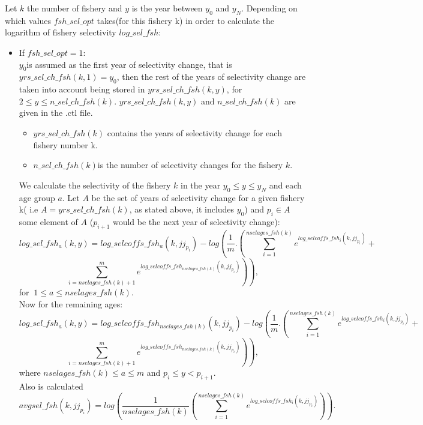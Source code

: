 \documentclass{article}
\begin{document}
Let $k$ the number of fishery and $y$ is the year between $y_0$ and $y_N$.
Depending on which values $fsh\_sel\_opt$ takes(for this fishery k) in order to calculate the logarithm of fishery selectivity $log\_sel\_fsh$:
\begin{itemize}
\item If $fsh\_sel\_opt=1:$\\

$y_0$is assumed as the first year of selectivity change, that is $yrs\_sel\_ch\_fsh(k,1)=y_0$, then the rest of the years of selectivity change are taken into account being stored in $yrs\_sel\_ch\_fsh(k,y)$, for $2\leq y \leq n\_sel\_ch\_fsh(k)$. $yrs\_sel\_ch\_fsh(k,y)$ and $n\_sel\_ch\_fsh(k)$  are given in the .ctl file.
\begin{itemize}
    \item $yrs\_sel\_ch\_fsh(k)$ contains the years of selectivity change for each fishery number k.
    \item $n\_sel\_ch\_fsh(k)$is the number of selectivity changes for the fishery $k$.
    
\end{itemize}


We calculate the selectivity of the fishery $k$ in the year $y_0\leq y \leq y_N$ and each age group $a$. Let $A$ be the set of years of selectivity change for a given fishery k( i.e $A= yrs\_sel\_ch\_fsh(k)$, as stated above, it includes $y_0$) and $p_i\in A$  some element of $A$ ($p_{i+1}$ would be the next year of selectivity change):
 \begin{equation}
        log\_sel\_fsh_a(k,y)=log\_selcoffs\_fsh_a(k,jj_{p_i})-log\left(\dfrac{1}{m}.\left(\sum_{i=1}^{nselages\_fsh(k)}e^{log\_selcoffs\_fsh_i(k,jj_{p_i})}+\right.\right.
    \end{equation}
    \begin{equation*}
       \left. \left.\sum_{i=nselages\_fsh(k)+1}^{m}e^{log\_selcoffs\_fsh_{nselages\_fsh(k)}(k,jj_{p_i})}\right)\right), 
    \end{equation*}
   for $\ 1\leq a \leq nselages\_fsh(k)$.\\
   
  Now for the remaining ages:
    \begin{equation}
         log\_sel\_fsh_a(k,y)=log\_selcoffs\_fsh_{nselages\_fsh(k)}(k,jj_{p_i})-log\left(\dfrac{1}{m}.\left(\sum_{i=1}^{nselages\_fsh(k)}e^{log\_selcoffs\_fsh_i(k,jj_{p_i})}+\right.\right.
    \end{equation}
 \begin{equation*}
       \left. \left.\sum_{i=nselages\_fsh(k)+1}^{m}e^{log\_selcoffs\_fsh_{nselages\_fsh(k)}(k,jj_{p_i})}\right)\right), 
    \end{equation*}
    where $nselages\_fsh(k)\leq a \leq m$ and $p_i\leq y < p_{i+1}$.\\
    Also is calculated
    \begin{equation}
        avgsel\_fsh(k,jj_{p_i})=log\left(\dfrac{1}{nselages\_fsh(k)}\left( \sum_{i=1}^{nselages\_fsh(k)}e^{log\_selcoffs\_fsh_i(k,jj_{p_i})}\right)\right).
    \end{equation}
    

\end{itemize}
\end{document}
